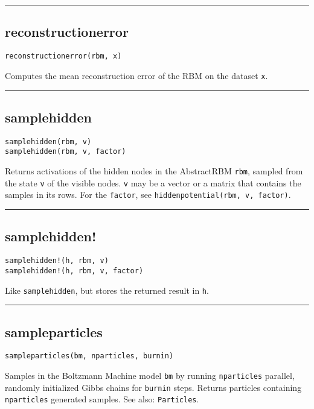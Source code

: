 \noindent\rule{\textwidth}{1pt}
\subsection*{reconstructionerror}  \label{bms_reconstructionerror}
\begin{verbatim}
reconstructionerror(rbm, x)
\end{verbatim}
Computes the mean reconstruction error of the RBM on the dataset \texttt{x}.

\noindent\rule{\textwidth}{1pt}
\subsection*{samplehidden}  \label{bms_samplehidden}
\begin{verbatim}
samplehidden(rbm, v)
samplehidden(rbm, v, factor)
\end{verbatim}
Returns activations of the hidden nodes in the AbstractRBM \texttt{rbm}, sampled from the state \texttt{v} of the visible nodes. \texttt{v} may be a vector or a matrix that contains the samples in its rows. For the \texttt{factor}, see \texttt{hiddenpotential(rbm, v, factor)}.

\noindent\rule{\textwidth}{1pt}
\subsection*{samplehidden!}  \label{bms_samplehidden!}
\begin{verbatim}
samplehidden!(h, rbm, v)
samplehidden!(h, rbm, v, factor)
\end{verbatim}
Like \texttt{samplehidden}, but stores the returned result in \texttt{h}.

\noindent\rule{\textwidth}{1pt}
\subsection*{sampleparticles}  \label{bms_sampleparticles}
\begin{verbatim}
sampleparticles(bm, nparticles, burnin)
\end{verbatim}
Samples in the Boltzmann Machine model \texttt{bm} by running \texttt{nparticles} parallel, randomly initialized Gibbs chains for \texttt{burnin} steps. Returns particles containing \texttt{nparticles} generated samples. See also: \texttt{Particles}.

